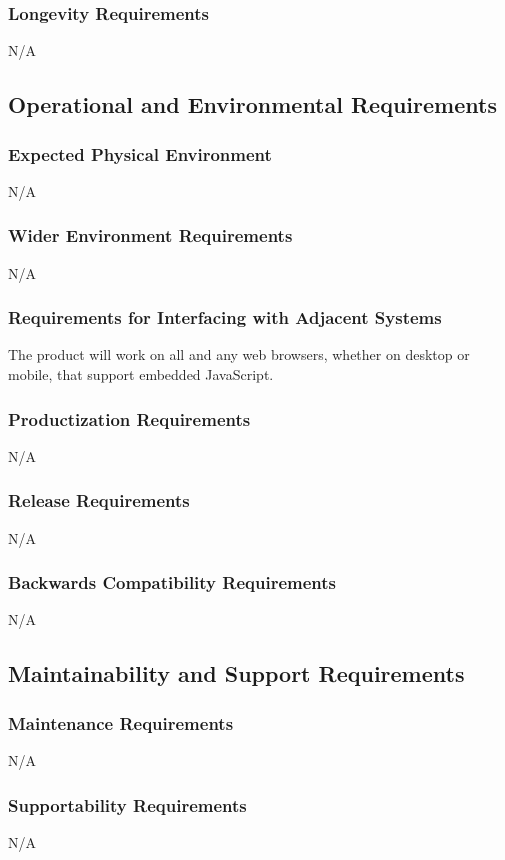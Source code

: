 \documentclass[12pt]{article}
\begin{document}
\subsubsection{Longevity Requirements}
N/A

\subsection{Operational and Environmental Requirements}


\subsubsection{Expected Physical Environment}
N/A

\subsubsection{Wider Environment Requirements}
N/A

\subsubsection{Requirements for Interfacing with Adjacent Systems}
The product will work on all and any web browsers, whether on desktop or mobile, that support embedded JavaScript.

\subsubsection{Productization Requirements}
N/A

\subsubsection{Release Requirements}
N/A

\subsubsection{Backwards Compatibility Requirements}
N/A
\subsection{Maintainability and Support Requirements}

\subsubsection{Maintenance Requirements}
N/A

\subsubsection{Supportability Requirements}
N/A
\end{document}
